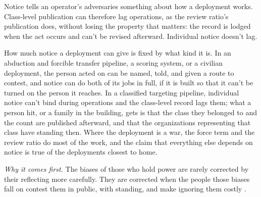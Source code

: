 Notice tells an operator's adversaries something about how a deployment works. Class-level publication can therefore lag operations, as the review ratio's publication does, without losing the property that matters: the record is lodged when the act occurs and can't be revised afterward. Individual notice doesn't lag.

How much notice a deployment can give is fixed by what kind it is. In an abduction and forcible transfer pipeline, a scoring system, or a civilian deployment, the person acted on can be named, told, and given a route to contest, and notice can do both of its jobs in full, if it is built so that it can't be turned on the person it reaches. In a classified targeting pipeline, individual notice can't bind during operations and the class-level record lags them; what a person hit, or a family in the building, gets is that the class they belonged to and the count are published afterward, and that the organizations representing that class have standing then. Where the deployment is a war, the force term and the review ratio do most of the work, and the claim that everything else depends on notice is true of the deployments closest to home.

\emph{Why it comes first.} The biases of those who hold power are rarely corrected by their reflecting more carefully. They are corrected when the people those biases fall on contest them in public, with standing, and make ignoring them costly \autocite{anderson2014social,anderson2015moral}.
